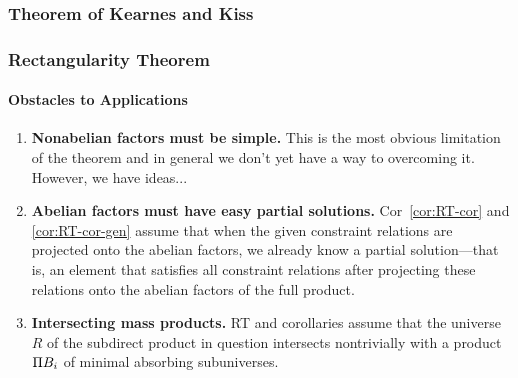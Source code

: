 \documentclass[xcolor=dvipsnames,9pt,hide notes,mathserif]{beamer}
\begin{document}
\begin{frame} \frametitle{Theorem of Kearnes and Kiss}

\end{frame}


\begin{frame} \frametitle{Rectangularity Theorem}
  \framesubtitle{Obstacles to Applications}

  \begin{enumerate}
  \item<1-> {\bf Nonabelian factors must be simple.}
    This is the most obvious limitation of the theorem and in general
    we don't yet have a way to overcoming it.  However, we have ideas...

  \item<2-> {\bf Abelian factors must have easy partial solutions.}
    Cor~\ref{cor:RT-cor} and \ref{cor:RT-cor-gen} assume that
    when the given constraint relations are projected onto the abelian factors,
    we already know a partial solution---that is, an element that satisfies all
    constraint relations after projecting these relations onto the abelian
    factors of the full product. 

  \item<3-> {\bf Intersecting mass products.}
    RT and corollaries assume that the universe $R$ of the subdirect
    product in question intersects nontrivially
    with a product $\Pi B_i$ of minimal absorbing subuniverses.
  \end{enumerate}

\end{frame}
\end{document}
